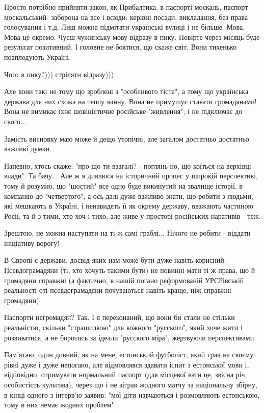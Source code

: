 \begin{cmtfront}

Просто потрібно прийняти закон, як Прибалтика, в паспорті москаль, паспорт
москальський- заборона на все і всюди: керівні посади, викладання, без права
голосування і т.д. Лиш можна підмітати українські вулиці і не більше. Мова.
Мова це окремо. Чуєш чужинську мову відразу в пику. Повірте через місяць буде
результат позитивний. І головне не боятися, що скаже світ. Вони тихенько
поаплодують Україні.	


Чого в пику?))) стріляти відразу)))

\end{cmtfront}

Але вони такі не тому що зроблені з "особливого тіста", а тому що українська
держава для них схожа на теплу ванну. Вона не примушує ставати громадянами!
Вона не вимикає їхнє шовіністичне російське "живлення", і не підключає до
свого...

Замість висновку маю може й дещо утопічні, але загалом достатньо достатньо
важливі думки.  

Напевно, хтось скаже: "про що ти взагалі? - поглянь-но, що коїться на верхівці
влади". Та бачу... Але ж я дивлюся на історичний процес у широкій перспективі,
тому й розумію, що "шостий" все одно буде викинутий на звалище історії, в
компанію до "четвертого", а ось далі дуже важливо знати, що робити з людьми,
які мешкають в Україні, і ненавидять її як окрему державу, вважають частиною
Росії; та й з тими, хто хоч і тихо, але живе у просторі російських наративів -
теж.

Зрештою, не можна наступати на ті ж самі граблі... Нічого не робити - віддати
ініціативу ворогу!

В Європі є держави, досвід яких нам може бути дуже навіть корисний.
Псевдограмадяни (ті, хто хочуть такими бути) не повинні мати ті ж права, що й
громадяни справжні (а фактично, в нашій погано реформованій УРСРівській
реальності оті псевдограмадяни почуваються навіть краще, ніж справжні
громадяни).

Паспорти негромадян? Так. І я переконаний, що вони би стали не стільки
реальністю, скільки "страшилкою" для кожного "русского", який хоче жити і
розвиватися, а не боротись за ідеали "русского міра", жертвуючи перспективами.

Пам'ятаю, один дивний, як на мене, естонський футболіст, який грав на своєму
рівні дуже і дуже непогано, але відмовлявся здавати іспит з естонської мови і,
відповідно, отримувати нормальний паспорт (для місцевої вати це, звісна річ,
особистість культова), через що і не зіграв жодного матчу за національну
збірну, в кінці одного з інтерв'ю заявив: "мої діти навчаються і розмовляють
естонською, тому в них немає жодних проблем".

